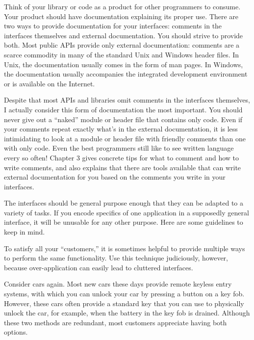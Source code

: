 Think of your library or code as a product for other programmers to consume. Your product should have documentation explaining its proper use.
There are two ways to provide documentation for your interfaces: comments in the interfaces themselves and external documentation. You should strive to provide both. Most public APIs provide only external documentation: comments are a scarce commodity in many of the standard Unix and Windows header files. In Unix, the documentation usually comes in the form of man pages. In Windows, the documentation usually accompanies the integrated development environment or is available on the Internet.

Despite that most APIs and libraries omit comments in the interfaces themselves, I actually consider this form of documentation the most important. You should never give out a “naked” module or header file that contains only code. Even if your comments repeat exactly what’s in the external documentation, it is less intimidating to look at a module or header file with friendly comments than one with only code. Even the best programmers still like to see written language every so often! Chapter 3 gives concrete tips for what to comment and how to write comments, and also explains that there are tools available that can write external documentation for you based on the comments you write in your interfaces.


The interfaces should be general purpose enough that they can be adapted to a variety of tasks. If you encode specifics of one application in a supposedly general interface, it will be unusable for any other purpose. Here are some guidelines to keep in mind.


To satisfy all your “customers,” it is sometimes helpful to provide multiple ways to perform the same functionality. Use this technique judiciously, however, because over-application can easily lead to cluttered interfaces.

Consider cars again. Most new cars these days provide remote keyless entry systems, with which you can unlock your car by pressing a button on a key fob. However, these cars often provide a standard key that you can use to physically unlock the car, for example, when the battery in the key fob is drained. Although these two methods are redundant, most customers appreciate having both options.

